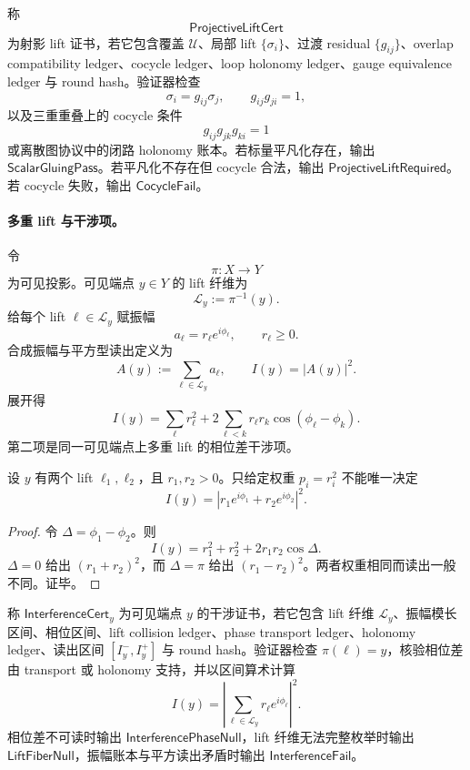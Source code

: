 \begin{definition}[射影 lift 证书]\label{def:typed-address-biaxial-completion-projective-lift-cert}
称
\[
\mathsf{ProjectiveLiftCert}
\]
为射影 lift 证书，若它包含覆盖 \(\mathcal U\)、局部 lift \(\{\sigma_i\}\)、过渡 residual \(\{g_{ij}\}\)、overlap compatibility ledger、cocycle ledger、loop holonomy ledger、gauge equivalence ledger 与 round hash。验证器检查
\[
\sigma_i=g_{ij}\sigma_j,\qquad
g_{ij}g_{ji}=1,
\]
以及三重重叠上的 cocycle 条件
\[
g_{ij}g_{jk}g_{ki}=1
\]
或离散图协议中的闭路 holonomy 账本。若标量平凡化存在，输出 \(\mathsf{ScalarGluingPass}\)。若平凡化不存在但 cocycle 合法，输出 \(\mathsf{ProjectiveLiftRequired}\)。若 cocycle 失败，输出 \(\mathsf{CocycleFail}\)。
\end{definition}

\paragraph{多重 lift 与干涉项。}
令
\[
\pi:X\to Y
\]
为可见投影。可见端点 \(y\in Y\) 的 lift 纤维为
\[
\mathcal L_y:=\pi^{-1}(y).
\]
给每个 lift \(\ell\in\mathcal L_y\) 赋振幅
\[
a_\ell=r_\ell e^{i\phi_\ell},
\qquad r_\ell\ge0.
\]
合成振幅与平方型读出定义为
\[
A(y):=\sum_{\ell\in\mathcal L_y}a_\ell,
\qquad
\boxed{
I(y)=|A(y)|^2.
}
\]
展开得
\[
I(y)=
\sum_\ell r_\ell^2
+
2\sum_{\ell<k}r_\ell r_k\cos(\phi_\ell-\phi_k).
\]
第二项是同一可见端点上多重 lift 的相位差干涉项。

\begin{theorem}[干涉项不可由概率权重推出]\label{thm:typed-address-biaxial-completion-interference-not-determined-by-weights}
设 \(y\) 有两个 lift \(\ell_1,\ell_2\)，且 \(r_1,r_2>0\)。只给定权重 \(p_i=r_i^2\) 不能唯一决定
\[
I(y)=|r_1e^{i\phi_1}+r_2e^{i\phi_2}|^2.
\]
\end{theorem}
\begin{proof}
令 \(\Delta=\phi_1-\phi_2\)。则
\[
I(y)=r_1^2+r_2^2+2r_1r_2\cos\Delta.
\]
\(\Delta=0\) 给出 \((r_1+r_2)^2\)，而 \(\Delta=\pi\) 给出 \((r_1-r_2)^2\)。两者权重相同而读出一般不同。证毕。
\end{proof}

\begin{definition}[干涉证书]\label{def:typed-address-biaxial-completion-interference-cert}
称 \(\mathsf{InterferenceCert}_y\) 为可见端点 \(y\) 的干涉证书，若它包含 lift 纤维 \(\mathcal L_y\)、振幅模长区间、相位区间、lift collision ledger、phase transport ledger、holonomy ledger、读出区间 \([I_y^-,I_y^+]\) 与 round hash。验证器检查 \(\pi(\ell)=y\)，核验相位差由 transport 或 holonomy 支持，并以区间算术计算
\[
I(y)=\left|
\sum_{\ell\in\mathcal L_y}
r_\ell e^{i\phi_\ell}
\right|^2.
\]
相位差不可读时输出 \(\mathsf{InterferencePhaseNull}\)，lift 纤维无法完整枚举时输出 \(\mathsf{LiftFiberNull}\)，振幅账本与平方读出矛盾时输出 \(\mathsf{InterferenceFail}\)。
\end{definition}

